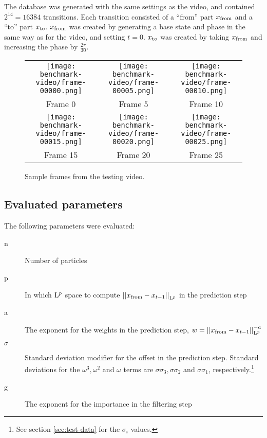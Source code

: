 The database was generated with the same settings as the video, and
contained $2^{14} = 16384$ transitions. Each transition consisted of a
``from'' part $\tf$ and a ``to'' part $\tt$. $\tf$ was created by
generating a base state and phase in the same way as for the video,
and setting $t=0$. $\tt$ was created by taking $\tf$ and increasing
the phase by $\frac{2\pi}{30}$.

\begin{figure}
  \centering
  \begin{tabular}{ccc}
    \texttt{[image: benchmark-video/frame-00000.png]} &
    \texttt{[image: benchmark-video/frame-00005.png]} &
    \texttt{[image: benchmark-video/frame-00010.png]}\\
    Frame 0 & Frame 5 & Frame 10\\
    \texttt{[image: benchmark-video/frame-00015.png]} &
    \texttt{[image: benchmark-video/frame-00020.png]} &
    \texttt{[image: benchmark-video/frame-00025.png]}\\
    Frame 15 & Frame 20 & Frame 25
  \end{tabular}
  \caption{Sample frames from the testing video.}
  \label{fig:benchmark-video}
\end{figure}  


\subsection{Evaluated parameters}
The following parameters were evaluated:

\begin{description}
\item[n] Number of particles
\item[p] In which $\Lp$ space to compute $\Lpnorm{\tf - x_{t-1}}$ in
  the prediction step
\item[a] The exponent for the weights in the prediction step, $w =
  \Lpnorm{\tf - x_{t-1}}^{-a}$
\item[$\sigma$] Standard deviation modifier for the offset in the
  prediction step. Standard deviations for the $\omega^3, \omega^2$
  and $\omega$ terms are $\sigma\sigma_3, \sigma\sigma_2$ and
  $\sigma\sigma_1$, respectively.\footnote{See section
    \ref{sec:test-data} for the $\sigma_i$ values.}
\item[g] The exponent for the importance in the filtering step
\end{description}

